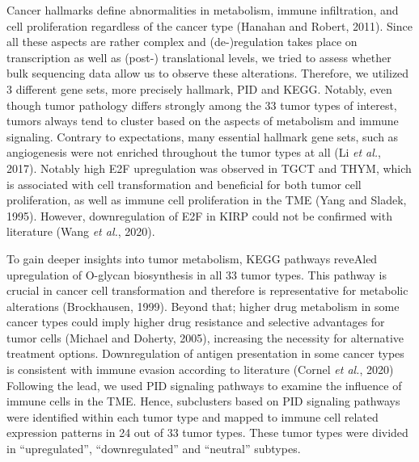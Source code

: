 \documentclass[
  parskip,
  oneside]{scrreprt}
\begin{document}
Cancer hallmarks define abnormalities in metabolism, immune
infiltration, and cell proliferation regardless of the cancer type
(Hanahan and Robert, 2011). Since all these aspects are rather complex
and (de-)regulation takes place on transcription as well as (post-)
translational levels, we tried to assess whether bulk sequencing data
allow us to observe these alterations. Therefore, we utilized 3
different gene sets, more precisely hallmark, PID and KEGG. Notably,
even though tumor pathology differs strongly among the 33 tumor types of
interest, tumors always tend to cluster based on the aspects of
metabolism and immune signaling. Contrary to expectations, many
essential hallmark gene sets, such as angiogenesis were not enriched
throughout the tumor types at all (Li \emph{et al.}, 2017). Notably high
E2F upregulation was observed in TGCT and THYM, which is associated with
cell transformation and beneficial for both tumor cell proliferation, as
well as immune cell proliferation in the TME (Yang and Sladek, 1995).
However, downregulation of E2F in KIRP could not be confirmed with
literature (Wang \emph{et al.}, 2020).

To gain deeper insights into tumor metabolism, KEGG pathways reveAled
upregulation of O-glycan biosynthesis in all 33 tumor types. This
pathway is crucial in cancer cell transformation and therefore is
representative for metabolic alterations (Brockhausen, 1999). Beyond
that; higher drug metabolism in some cancer types could imply higher
drug resistance and selective advantages for tumor cells (Michael and
Doherty, 2005), increasing the necessity for alternative treatment
options. Downregulation of antigen presentation in some cancer types is
consistent with immune evasion according to literature (Cornel \emph{et
al.}, 2020) Following the lead, we used PID signaling pathways to
examine the influence of immune cells in the TME. Hence, subclusters
based on PID signaling pathways were identified within each tumor type
and mapped to immune cell related expression patterns in 24 out of 33
tumor types. These tumor types were divided in ``upregulated'',
``downregulated'' and ``neutral'' subtypes.
\end{document}

